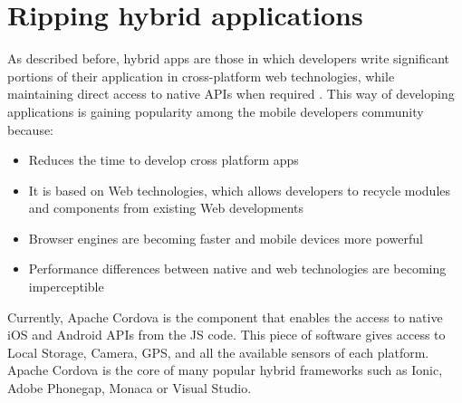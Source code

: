 %	
%	
%    
%    

\section{Ripping  hybrid applications}
As described before, hybrid apps are those in which developers write significant portions of their application in cross-platform web technologies, while maintaining direct access to native APIs when required \cite{ibmHybrid}. This way of developing applications is gaining popularity among the mobile developers community because:
\begin{itemize}
	\item Reduces the time to develop cross platform apps
	\item It is based on Web technologies, which allows developers to recycle modules and components from existing Web developments
	\item Browser engines are becoming faster and mobile devices more powerful
	\item Performance differences between native and web technologies are becoming imperceptible
\end{itemize}

Currently, Apache Cordova is the component that enables the access to native iOS and Android APIs from the JS code. This piece of software gives access to Local Storage, Camera, GPS, and all the available sensors of each platform. Apache Cordova is the core of many popular hybrid frameworks such as Ionic, Adobe Phonegap, Monaca or Visual Studio. 


